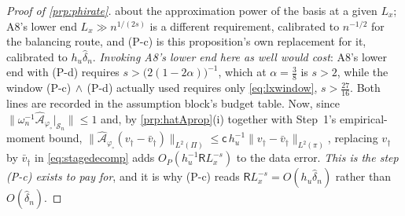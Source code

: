 \begin{proof}[Proof of \cref{prp:phirate}]
about the approximation power of the basis at a given $L_x$; A8's lower end $L_x\gg n^{1/(2s)}$ is a
different requirement, calibrated to $n^{-1/2}$ for the balancing route, and (P-c) is this proposition's
own replacement for it, calibrated to $h_u\hat\delta_n$. \emph{Invoking A8's lower end here as well would
cost}: A8's lower
end with (P-d) requires $s>\big(2(1-2\alpha)\big)^{-1}$, which at $\alpha=\tfrac38$ is $s>2$, while the
window (P-c)$\,\wedge\,$(P-d) actually used requires only \eqref{eq:lxwindow}, $s>\tfrac{27}{16}$. Both
lines are recorded in the assumption block's budget table.
Now, since $\|\omega_n^{-1}\hat{\mathcal A}_{\varphi_\circ}\vert_{\mathcal S_n}\|\le1$ and, by
\cref{prp:hatAprop}(i) together with Step~1's empirical-moment bound,
$\|\hat{\mathcal A}_{\varphi_\circ}(v_\dagger-\bar v_\dagger)\|_{L^{2}(\Pi)}
\le\mathsf c\,h_u^{-1}\|v_\dagger-\bar v_\dagger\|_{L^{2}(\pi)}$, replacing $v_\dagger$ by
$\bar v_\dagger$ in \eqref{eq:stagedecomp} adds $O_P(h_u^{-1}\mathsf RL_x^{-s})$ to the data error.
\emph{This is the step (P-c) exists to pay for}, and it is why (P-c) reads
$\mathsf RL_x^{-s}=O(h_u\hat\delta_n)$ rather than $O(\hat\delta_n)$.


\end{proof}
